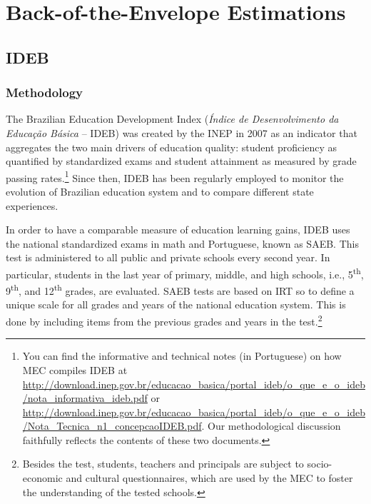 \documentclass[11pt,a4paper]{article}
\begin{document}
	\clearpage
	\section{Back-of-the-Envelope Estimations} 
	\setcounter{table}{0}
	\setcounter{figure}{0}
	\setcounter{equation}{0}
	\renewcommand{\thetable}{B\arabic{table}}
	\renewcommand{\thefigure}{B\arabic{figure}}
	\renewcommand{\theequation}{B\arabic{equation}}
	
	\subsection{IDEB} \label{sec:ideb}
	
	\subsubsection*{Methodology}
	The Brazilian Education Development Index (\textit{Índice de Desenvolvimento da Educação Básica} -- IDEB) was created by the INEP in 2007 as an indicator that aggregates the two main drivers of education quality: student proficiency as quantified by standardized exams and student attainment as measured by grade passing rates.\footnote{You can find the informative and technical notes (in Portuguese) on how MEC compiles IDEB at \href{http://download.inep.gov.br/educacao_basica/portal_ideb/o_que_e_o_ideb/nota_informativa_ideb.pdf}{http://download.inep.gov.br/educacao\_basica/portal\_ideb/o\_que\_e\_o\_ideb/nota\_informativa\_ideb.pdf} or \href{http://download.inep.gov.br/educacao_basica/portal_ideb/o_que_e_o_ideb/Nota_Tecnica_n1_concepcaoIDEB.pdf}{http://download.inep.gov.br/educacao\_basica/portal\_ideb/o\_que\_e\_o\_ideb/Nota\_Tecnica\_n1\_concepcaoIDEB.pdf}. Our methodological discussion faithfully reflects the contents of these two documents.} Since then, IDEB has been regularly employed to monitor the evolution of Brazilian education system and to compare different state experiences.
	
	In order to have a comparable measure of education learning gains, IDEB uses the national standardized exams in math and Portuguese, known as SAEB. This test is administered to all public and private schools every second year. In particular, students in the last year of primary, middle, and high schools, i.e., 5\textsuperscript{th}, 9\textsuperscript{th}, and 12\textsuperscript{th} grades, are evaluated. SAEB tests are based on IRT so to define a unique scale for all grades and years of the national education system. This is done by including items from the previous grades and years in the test.\footnote{Besides the test, students, teachers and principals are subject to socio-economic and cultural questionnaires, which are used by the MEC to foster the understanding of the tested schools.}
	
\end{document}
